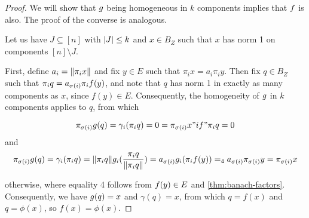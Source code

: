 \documentclass{amsart}
\theoremstyle{definition}
\begin{document}
\begin{proof} 

  We will show that $g$ being homogeneous in $k$ components implies that $f$ is also. The proof of the converse is analogous.

  Let us have $J \subseteq [n]$ with $\abs{J} \leq k$ and $x \in B_Z$ such that $x$ has norm 1 on components $[n] \setminus J$.

  First, define $a_i = \norm{\pi_i x}$ and fix $y \in E$ such that
  $\pi_i x = a_i \pi_i y$. Then fix $q \in B_Z$ such that $\pi_i q = a_{\sigma(i)} \pi_i f(y)$, and note that $q$ has norm 1 in exactly as many components as $x$, since $f(y) \in E$. Consequently, the homogeneity of $g$ in $k$ components applies to $q$, from which

  \[ \pi_{\sigma(i)} g(q) = \gamma_i (\pi_i q) = 0 = \pi_{\sigma(i)} x "      if"
  \pi_i q = 0 \]
  and
  \[ \pi_{\sigma(i)} g(q) = \gamma_i (\pi_i q) = \norm{\pi_i q} g_i (\frac{\pi_i q}{\norm{\pi_i q}}) = a_{\sigma(i)} g_i (\pi_i f(y)) =_4 a_{\sigma(i)} \pi_{\sigma(i)} y = \pi_{\sigma(i)} x \]

  otherwise, where equality 4 follows from $f(y) \in E$ and \autoref{thm:banach-factors}.
  Consequently, we have $g(q) = x$ and $\gamma(q) = x$, from which
  $q = f(x)$ and $q = \phi(x)$, so $f(x) = \phi(x)$.
\end{proof}
\end{document}
